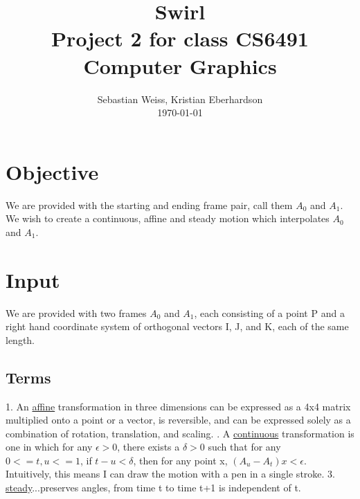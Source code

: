 \documentclass[journal, letterpaper]{IEEEtran}
\begin{document}
\title{Swirl \\
	{\large Project 2 for class CS6491 Computer Graphics}}
\author{Sebastian Weiss, Kristian Eberhardson\\ \today}

\maketitle


\section{Objective}
We are provided with the starting and ending frame pair, call them $A_0$ and $A_1$.  We wish to create a continuous, affine and steady motion which interpolates $A_0$ and $A_1$.
 
\section{Input}
We are provided with two frames $A_0$ and $A_1$, each consisting of a point P and a right hand coordinate system of orthogonal vectors I, J, and K, each of the same length.
\subsection{Terms} 
1. An \underline{affine} transformation in three dimensions can be expressed as a 4x4 matrix multiplied onto a point or a vector, is reversible, and can be expressed solely as a combination of rotation, translation, and scaling.
. A \underline{continuous} transformation is one in which for any $\epsilon > 0$, there exists a $\delta > 0$ such that for any $0 <= t, u <= 1$, if $t - u < \delta$, then for any point x, $(A_u - A_t)x < \epsilon$.  Intuitively, this means I can draw the motion with a pen in a single stroke.
3. \underline{steady}...preserves angles, from time t to time t+1 is independent of t. 
\end{document}
